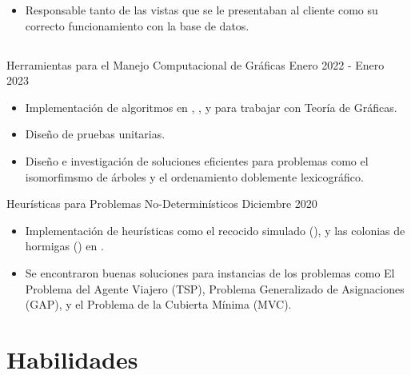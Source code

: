 \documentclass{resume}
\begin{document}
\begin{paracol}{2}
{\begin{itemize}
              \item Responsable tanto de las vistas que se le presentaban al
                cliente como su correcto funcionamiento con la base de datos.
            \end{itemize}
          }

      \subsection{\large{}}

      \project%
          {Herramientas para el Manejo Computacional de Gráficas}
          {Enero 2022 - Enero 2023}
          {
            \begin{itemize}
              \item Implementación de algoritmos en , , y
                 para trabajar con Teoría de Gráficas.

              \item Diseño de pruebas unitarias.
                
              \item Diseño e investigación de soluciones eficientes para
                problemas como el isomorfimsmo de árboles y el ordenamiento
                doblemente lexicográfico.
            \end{itemize}
          }
          
      \project%
          {Heurísticas para Problemas No-Determinísticos}
          {Diciembre 2020}
          {
            \begin{itemize}
              \item 
                Implementación de heurísticas como el recocido simulado
                (), y las colonias de hormigas
                () en .
                
              \item
                Se encontraron buenas soluciones para instancias de los
                problemas como El Problema del Agente Viajero (TSP), Problema
                Generalizado de Asignaciones (GAP), y el Problema de la Cubierta
                Mínima (MVC).
            \end{itemize}
          }

    \switchcolumn
      
    \section{Habilidades}
    

\end{paracol}
\end{document}
